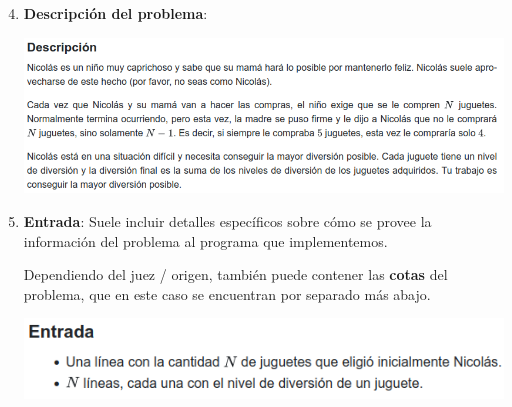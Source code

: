 \documentclass{beamer}
\begin{document}
    \begin{frame}[noframenumbering]
        \begin{enumerate}
            \setcounter{enumi}{3}
            \item \textbf{Descripción del problema}: \pause

            \begin{center}
                \includegraphics[width=.8\linewidth]{./res/ou_description.png}
            \end{center} \pause

        \item \textbf{Entrada}: \pause Suele incluir detalles específicos sobre cómo se provee la información del problema al programa que implementemos. \pause

            Dependiendo del juez / origen, también puede contener las \textbf{cotas} del problema, que en este caso se encuentran por separado más abajo. \pause

            \begin{center}
                \includegraphics[width=.8\linewidth]{./res/ou_input.png}
            \end{center}
        \end{enumerate}
    \end{frame}
\end{document}
